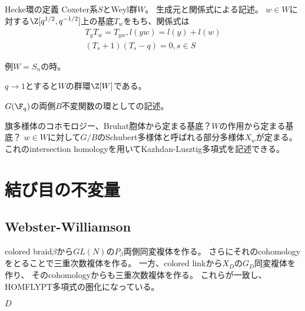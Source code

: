 \documentclass[uplatex]{jsarticle}
\begin{document}
Hecke環の定義
Coxeter系$S$とWeyl群$W$。
生成元と関係式による記述。
$w\in W$に対する$\Z[q^{1/2}, q^{-1/2}]$上の基底$T_w$をもち、関係式は
\begin{align*}
T_yT_w=T_{yw}, l(yw)=l(y)+l(w)\\
(T_s+1)(T_s-q)=0, s\in S
\end{align*}

例$W=S_n$の時。

$q\to 1$とすると$W$の群環$\Z[W]$である。

$G(\F_q)$の両側$B$不変関数の環としての記述。


旗多様体のコホモロジー、Bruhat胞体から定まる基底？$W$の作用から定まる基底？
$w\in W$に対して$G/B$のSchubert多様体と呼ばれる部分多様体$X_w$が定まる。
これのintersection homologyを用いてKazhdan-Lusztig多項式を記述できる。

\section{結び目の不変量}

\subsection{Webster-Williamson}
colored braid$\beta$から$GL(N)$の$P_\beta$両側同変複体を作る。
さらにそれのcohomologyをとることで三重次数複体を作る。
一方、colored linkから$X_D$の$G_D$同変複体を作り、
そのcohomologyからも三重次数複体を作る。
これらが一致し、HOMFLYPT多項式の圏化になっている。

$D$
\subsection{}
\end{document}
